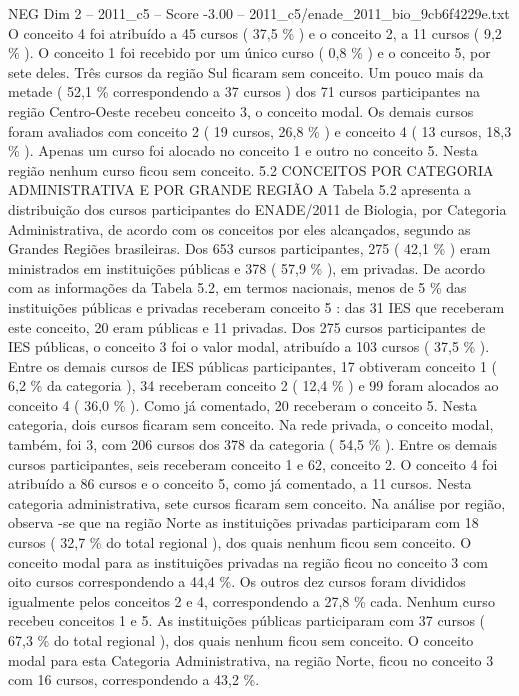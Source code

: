 \begin{textsample}{NEG Dim 2 – 2011\_c5 – Score -3.00 – 2011\_c5/enade\_2011\_bio\_9cb6f4229e.txt}
O conceito 4 foi atribuído a 45 cursos ( 37,5 \% ) e o conceito 2, a 11 cursos ( 9,2 \% ).
O conceito 1 foi recebido por um único curso ( 0,8 \% ) e o conceito 5, por sete deles.
Três cursos da região Sul ficaram sem conceito.
Um pouco mais da metade ( 52,1 \% correspondendo a 37 cursos ) dos 71 cursos participantes na região Centro-Oeste recebeu conceito 3, o conceito modal.
Os demais cursos foram avaliados com conceito 2 ( 19 cursos, 26,8 \% ) e conceito 4 ( 13 cursos, 18,3 \% ).
Apenas um curso foi alocado no conceito 1 e outro no conceito 5.
Nesta região nenhum curso ficou sem conceito. 5.2 CONCEITOS POR CATEGORIA ADMINISTRATIVA E POR GRANDE REGIÃO A Tabela 5.2 apresenta a distribuição dos cursos participantes do ENADE/2011 de Biologia, por Categoria Administrativa, de acordo com os conceitos por eles alcançados, segundo as Grandes Regiões brasileiras.
Dos 653 cursos participantes, 275 ( 42,1 \% ) eram ministrados em instituições públicas e 378 ( 57,9 \% ), em privadas.
De acordo com as informações da Tabela 5.2, em termos nacionais, menos de 5 \% das instituições públicas e privadas receberam conceito 5 : das 31 IES que receberam este conceito, 20 eram públicas e 11 privadas.
Dos 275 cursos participantes de IES públicas, o conceito 3 foi o valor modal, atribuído a 103 cursos ( 37,5 \% ).
Entre os demais cursos de IES públicas participantes, 17 obtiveram conceito 1 ( 6,2 \% da categoria ), 34 receberam conceito 2 ( 12,4 \% ) e 99 foram alocados ao conceito 4 ( 36,0 \% ).
Como já comentado, 20 receberam o conceito 5.
Nesta categoria, dois cursos ficaram sem conceito.
Na rede privada, o conceito modal, também, foi 3, com 206 cursos dos 378 da categoria ( 54,5 \% ).
Entre os demais cursos participantes, seis receberam conceito 1 e 62, conceito 2.
O conceito 4 foi atribuído a 86 cursos e o conceito 5, como já comentado, a 11 cursos.
Nesta categoria administrativa, sete cursos ficaram sem conceito.
Na análise por região, observa -se que na região Norte as instituições privadas participaram com 18 cursos ( 32,7 \% do total regional ), dos quais nenhum ficou sem conceito.
O conceito modal para as instituições privadas na região ficou no conceito 3 com oito cursos correspondendo a 44,4 \%.
Os outros dez cursos foram divididos igualmente pelos conceitos 2 e 4, correspondendo a 27,8 \% cada.
Nenhum curso recebeu conceitos 1 e 5.
As instituições públicas participaram com 37 cursos ( 67,3 \% do total regional ), dos quais nenhum ficou sem conceito.
O conceito modal para esta Categoria Administrativa, na região Norte, ficou no conceito 3 com 16 cursos, correspondendo a 43,2 \%.

\end{textsample}
